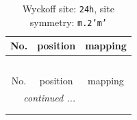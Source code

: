 \documentclass[fleqn,8pt]{jsarticle}
\begin{document}
\renewcommand{\arraystretch}{1.2}
\begin{longtable}{ccc}
\caption{Wyckoff site: {\tt 24h}, site symmetry: {\tt m.2'm'}}
 \\
 \hline \hline
No. & position & mapping \\ \hline \endfirsthead

\multicolumn{2}{l}{\tablename\ \thetable{}} \\
 \hline \hline
No. & position & mapping \\ \hline \endhead

 \hline \hline
\multicolumn{2}{r}{\footnotesize\it continued ...} \\ \endfoot

 \hline \hline
\multicolumn{2}{r}{} \\ \endlastfoot


\end{longtable}
\end{document}
